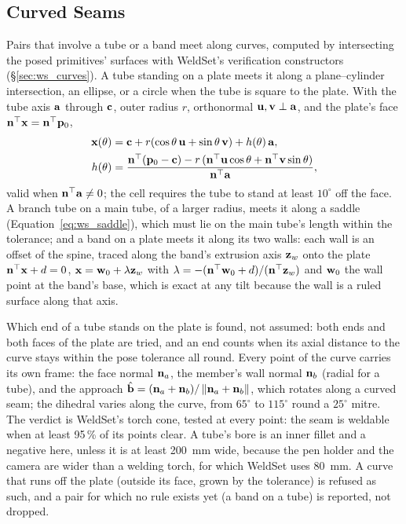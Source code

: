 \subsection{Curved Seams}
\label{sec:mc_curved}
Pairs that involve a tube or a band meet along curves, computed by intersecting the posed primitives'
surfaces with WeldSet's verification constructors (\S\ref{sec:ws_curves}). A tube standing on a plate
meets it along a plane--cylinder intersection, an ellipse, or a circle when the tube is square to the
plate. With the tube axis $\mathbf{a}$ through $\mathbf{c}$, outer radius $r$, orthonormal
$\mathbf{u},\mathbf{v}\perp\mathbf{a}$, and the plate's face $\mathbf{n}^{\top}\mathbf{x}=\mathbf{n}^{\top}\mathbf{p}_0$,
\begin{equation}
\begin{aligned}
\mathbf{x}(\theta) &= \mathbf{c} + r(\cos\theta\,\mathbf{u}+\sin\theta\,\mathbf{v}) + h(\theta)\,\mathbf{a},\\
h(\theta) &= \frac{\mathbf{n}^{\top}(\mathbf{p}_0-\mathbf{c}) - r\,(\mathbf{n}^{\top}\mathbf{u}\cos\theta+\mathbf{n}^{\top}\mathbf{v}\sin\theta)}{\mathbf{n}^{\top}\mathbf{a}} ,
\end{aligned}
\label{eq:ellipse_seam}
\end{equation}
valid when $\mathbf{n}^{\top}\mathbf{a}\neq0$; the cell requires the tube to stand at least $10^\circ$
off the face. A branch tube on a main tube, of a larger radius, meets it along a saddle
(Equation~\ref{eq:ws_saddle}), which must lie on the main tube's length within the tolerance; and a
band on a plate meets it along its two walls: each wall is an offset of the spine, traced along the
band's extrusion axis $\mathbf{z}_w$ onto the plate $\mathbf{n}^{\top}\mathbf{x}+d=0$,
$\mathbf{x}=\mathbf{w}_0+\lambda\mathbf{z}_w$ with
$\lambda=-(\mathbf{n}^{\top}\mathbf{w}_0+d)/(\mathbf{n}^{\top}\mathbf{z}_w)$ and $\mathbf{w}_0$ the wall point at
the band's base, which is exact at any tilt because the wall is a ruled surface along that axis.

Which end of a tube stands on the plate is found, not assumed: both ends and both faces of the plate
are tried, and an end counts when its axial distance to the curve stays within the pose tolerance all
round. Every point of the curve carries its own frame: the face normal $\mathbf{n}_a$, the member's wall
normal $\mathbf{n}_b$ (radial for a tube), and the approach
$\hat{\mathbf{b}}=(\mathbf{n}_a+\mathbf{n}_b)/\left\lVert\mathbf{n}_a+\mathbf{n}_b\right\rVert$, which rotates along a curved
seam; the dihedral varies along the curve, from $65^\circ$ to $115^\circ$ round a $25^\circ$ mitre.
The verdict is WeldSet's torch cone, tested at every point: the seam is weldable when at least 95\,\% of
its points clear. A tube's bore is an inner fillet and a negative here, unless it is at least 200~mm
wide, because the pen holder and the camera are wider than a welding torch, for which WeldSet uses
80~mm. A curve that runs off the plate (outside its face, grown by the tolerance) is refused as such, and a pair for which no rule exists yet (a
band on a tube) is reported, not dropped.

